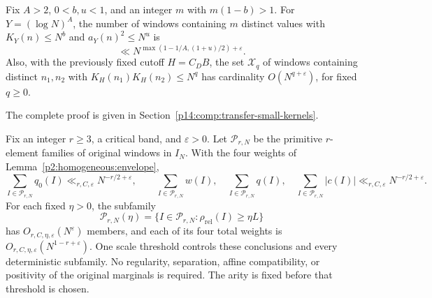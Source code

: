 \begin{lemma}
\label{p13:transfer:small-kernels}
Fix $A>2$, $0<b,u<1$, and an integer $m$ with $m(1-b)>1$.
For $Y=(\log N)^A$, the number of windows containing $m$ distinct
values with $K_Y(n)\leq N^b$ and $a_Y(n)^2\leq N^u$ is
\begin{equation}
 \ll N^{\max(1-1/A,(1+u)/2)+\varepsilon}.
 \label{p13:transfer:small-kernels-bound}
\end{equation}
Also, with the previously fixed cutoff $H=C_DB$, the set
$\mathcal X_q$ of windows containing distinct $n_1,n_2$
with $K_H(n_1)K_H(n_2)\leq N^q$ has cardinality
$O(N^{q+\varepsilon})$, for fixed $q\geq0$.
\end{lemma}

\noindent The complete proof is given in Section~\ref{p14:comp:transfer-small-kernels}.


\begin{proposition}
\label{p13:transfer:primitive}
\label{p2:homogeneous:primitive}
Fix an integer $r\ge3$, a critical band, and $\varepsilon>0$.
Let $\mathcal P_{r,N}$ be the primitive $r$-element families of original
windows in $I_N$. With the four weights of
Lemma~\ref{p2:homogeneous:envelope},
\begin{equation}
 \sum_{I\in\mathcal P_{r,N}}q_0(I)
       \ll_{r,C,\varepsilon}N^{-r/2+\varepsilon},
 \qquad
 \sum_{I\in\mathcal P_{r,N}}w(I),\quad
 \sum_{I\in\mathcal P_{r,N}}q(I),\quad
 \sum_{I\in\mathcal P_{r,N}}|c(I)|
       \ll_{r,C,\varepsilon}N^{-r/2+\varepsilon}.
 \label{p13:transfer:primitive-bound}
\end{equation}
For each fixed $\eta>0$, the subfamily
\[
 \mathcal P_{r,N}(\eta)
   =\{I\in\mathcal P_{r,N}:\rho_{\mathrm{rel}}(I)\ge\eta L\}
\]
has $O_{r,C,\eta,\varepsilon}(N^\varepsilon)$ members, and each of
its four total weights is $O_{r,C,\eta,\varepsilon}(N^{1-r+\varepsilon})$.
One scale threshold controls these conclusions and every deterministic
subfamily. No regularity, separation, affine compatibility, or positivity
of the original marginals is required. The arity is fixed before that
threshold is chosen.
\end{proposition}

